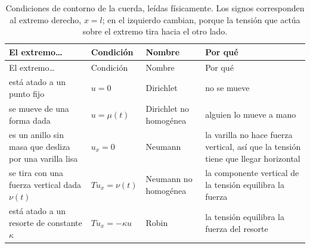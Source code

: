 \documentclass[
  spanish,
  a4paper,
]{scrbook}
\theoremstyle{definition}
\theoremstyle{plain}
\theoremstyle{definition}
\theoremstyle{plain}
\theoremstyle{definition}
\theoremstyle{remark}
\begin{document}
\begin{longtable}[]{@{}
  >{\raggedright\arraybackslash}p{}
  >{\raggedright\arraybackslash}p{}
  >{\raggedright\arraybackslash}p{}
  >{\raggedright\arraybackslash}p{}@{}}
\caption{Condiciones de contorno de la cuerda, leídas físicamente. Los
signos corresponden al extremo derecho, \(x=l\); en el izquierdo
cambian, porque la tensión que actúa sobre el extremo tira hacia el otro
lado.}\label{tbl-hip-bordes}\tabularnewline
\toprule\noalign{}
\begin{minipage}[b]{\linewidth}\raggedright
El extremo\ldots{}
\end{minipage} & \begin{minipage}[b]{\linewidth}\raggedright
Condición
\end{minipage} & \begin{minipage}[b]{\linewidth}\raggedright
Nombre
\end{minipage} & \begin{minipage}[b]{\linewidth}\raggedright
Por qué
\end{minipage} \\
\midrule\noalign{}
\endfirsthead
\toprule\noalign{}
\begin{minipage}[b]{\linewidth}\raggedright
El extremo\ldots{}
\end{minipage} & \begin{minipage}[b]{\linewidth}\raggedright
Condición
\end{minipage} & \begin{minipage}[b]{\linewidth}\raggedright
Nombre
\end{minipage} & \begin{minipage}[b]{\linewidth}\raggedright
Por qué
\end{minipage} \\
\midrule\noalign{}
\endhead
\bottomrule\noalign{}
\endlastfoot
está atado a un punto fijo & \(u = 0\) & Dirichlet & no se mueve \\
se mueve de una forma dada & \(u = \mu(t)\) & Dirichlet no homogénea &
alguien lo mueve a mano \\
es un anillo sin masa que desliza por una varilla lisa & \(u_x = 0\) &
Neumann & la varilla no hace fuerza vertical, así que la tensión tiene
que llegar horizontal \\
se tira con una fuerza vertical dada \(\nu(t)\) & \(T u_x = \nu(t)\) &
Neumann no homogénea & la componente vertical de la tensión equilibra la
fuerza \\
está atado a un resorte de constante \(\kappa\) & \(T u_x = -\kappa u\)
& Robin & la tensión equilibra la fuerza del resorte \\
\end{longtable}
\end{document}

